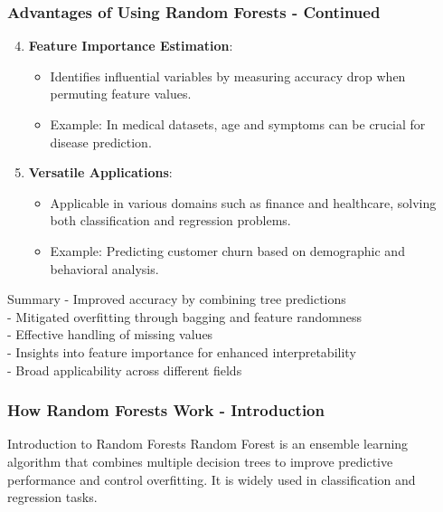 \documentclass[aspectratio=169]{beamer}
\begin{document}
\begin{frame}[fragile]
    \frametitle{Advantages of Using Random Forests - Continued}
    \begin{enumerate}
        \setcounter{enumi}{3} %
        \item \textbf{Feature Importance Estimation}:
        \begin{itemize}
            \item Identifies influential variables by measuring accuracy drop when permuting feature values.
            \item Example: In medical datasets, age and symptoms can be crucial for disease prediction.
        \end{itemize}

        \item \textbf{Versatile Applications}:
        \begin{itemize}
            \item Applicable in various domains such as finance and healthcare, solving both classification and regression problems.
            \item Example: Predicting customer churn based on demographic and behavioral analysis.
        \end{itemize}
    \end{enumerate}
    
    \begin{block}{Summary}
        - Improved accuracy by combining tree predictions\\
        - Mitigated overfitting through bagging and feature randomness\\
        - Effective handling of missing values\\
        - Insights into feature importance for enhanced interpretability\\
        - Broad applicability across different fields
    \end{block}
\end{frame}

\begin{frame}[fragile]
    \frametitle{How Random Forests Work - Introduction}
    \begin{block}{Introduction to Random Forests}
        Random Forest is an ensemble learning algorithm that combines multiple decision trees to improve predictive performance and control overfitting. It is widely used in classification and regression tasks.
    \end{block}
\end{frame}
\end{document}
